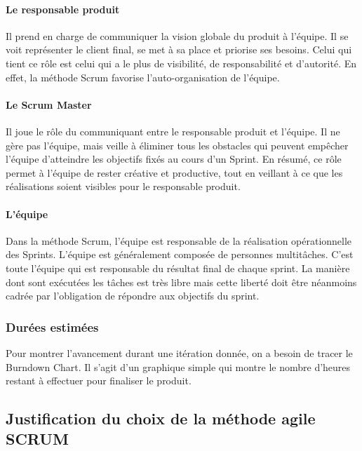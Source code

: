\paragraph{Le responsable produit}

Il prend en charge de communiquer la
vision globale du produit à l'équipe. 
Il se voit représenter le client final, se met à sa place
et priorise ses besoins. Celui qui tient ce rôle est celui qui 
a le plus de visibilité, de responsabilité et d'autorité.
En effet, la méthode Scrum favorise l'auto-organisation de l'équipe.

\paragraph{Le Scrum Master}

Il joue le rôle du communiquant entre le responsable produit et
l'équipe. Il ne gère pas l'équipe, mais veille à éliminer tous les obstacles qui peuvent
empêcher l'équipe d'atteindre les objectifs fixés au cours d'un Sprint. En résumé, ce rôle
permet à l'équipe de rester créative et productive, tout en veillant à ce que les
réalisations soient visibles pour le responsable produit.

\paragraph{L'équipe}

Dans la méthode Scrum, l'équipe est responsable de la réalisation
opérationnelle des Sprints. L'équipe est généralement composée de personnes
multitâches. C'est toute l'équipe qui est responsable du résultat final de chaque sprint.
La manière dont sont exécutées les tâches est très libre mais cette liberté doit être
néanmoins cadrée par l'obligation de répondre aux objectifs du sprint.

\subsubsection{Durées estimées}

Pour montrer l'avancement durant une itération donnée, on a besoin de tracer le
Burndown Chart. Il s'agit d'un graphique simple qui montre le nombre d'heures restant
à effectuer pour finaliser le produit. 

\subsection{Justification du choix de la méthode agile SCRUM}

